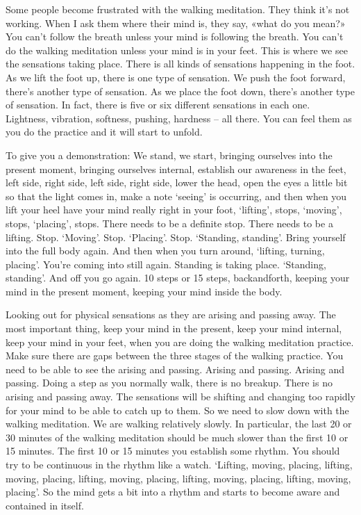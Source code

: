 \documentclass[letterpaper,10pt,english]{sphinxmanual}
\begin{document}
\sphinxAtStartPar
Some  people  become  frustrated  with  the  walking  meditation.  They
think it’s not working. When I ask them where their mind is, they say, «what
do you mean?» You can’t follow the breath unless your mind is following
the breath. You can’t do the walking meditation unless your mind is in your
feet. This is where we see the sensations taking place. There is all kinds of
sensations happening in the foot. As we lift the foot up, there is one type of
sensation. We push the foot forward, there’s another type of sensation. As we
place the foot down, there’s another type of sensation. In fact, there is five or
six different sensations in each one. Lightness, vibration, softness, pushing,
hardness – all there. You can feel them as you do the practice and it will start
to unfold.

\sphinxAtStartPar
To  give  you  a  demonstration: We  stand,  we  start,  bringing  ourselves
into  the  present  moment,  bringing  ourselves  internal,  establish  our  awareness    in  the  feet,  left  side,  right  side,  left  side,  right  side,  lower  the  head,
open the eyes a little bit so that the light comes in, make a note ‘seeing’ is
occurring, and then when you lift your heel have your mind really right in
your foot, ‘lifting’, stops, ‘moving’, stops, ‘placing’, stops.
There  needs  to
be a definite stop. There needs to be a lifting. Stop. ‘Moving’. Stop. ‘Placing’. Stop. ‘Standing, standing’. Bring yourself into the full body again. And
then when you turn around, ‘lifting, turning, placing’. You’re coming into
still  again.  Standing  is  taking  place.  ‘Standing,  standing’. And  off  you  go
again. 10 steps or 15 steps, back\sphinxhyphen{}and\sphinxhyphen{}forth, keeping your mind in the present
moment, keeping your mind inside the body.

\sphinxAtStartPar
Looking  out  for  physical  sensations  as  they  are  arising  and  passing
away. The most important thing, keep your mind in the present, keep your
mind internal, keep your mind in your feet, when you are doing the walking
meditation practice. Make sure there are gaps between the three stages of the
walking practice. You need to be able to see the arising and passing. Arising
and passing. Arising and passing. Doing a step as you normally walk, there
is no breakup. There is no arising and passing away. The sensations will be
shifting  and  changing  too  rapidly  for  your  mind  to  be  able  to  catch  up  to
them. So we need to slow down with the walking meditation. We are walking relatively slowly. In particular, the last 20 or 30 minutes of the walking
meditation should be much slower than the first 10 or 15 minutes. The first
10 or 15 minutes you establish some rhythm. You should try to be continuous in the rhythm like a watch. ‘Lifting, moving, placing, lifting, moving,
placing, lifting, moving, placing, lifting, moving, placing, lifting, moving,
placing’. So the mind gets a bit into a rhythm and starts to become aware
and contained in itself.
\end{document}
